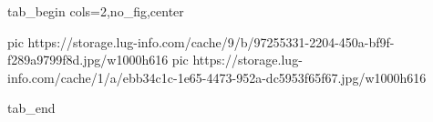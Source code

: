  
 
 
 
 


\ifcmt
  tab_begin cols=2,no_fig,center

     pic https://storage.lug-info.com/cache/9/b/97255331-2204-450a-bf9f-f289a9799f8d.jpg/w1000h616%
     pic https://storage.lug-info.com/cache/1/a/ebb34c1c-1e65-4473-952a-dc5953f65f67.jpg/w1000h616%

  tab_end
\fi
